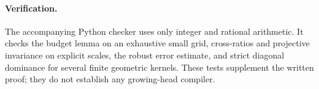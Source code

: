 \documentclass[11pt]{article}
\begin{document}
\paragraph{Verification.}
The accompanying Python checker uses only integer and rational
arithmetic. It checks the budget lemma on an exhaustive small grid,
cross-ratios and projective invariance on explicit scales, the robust
error estimate, and strict diagonal dominance for several finite
geometric kernels. These tests supplement the written proof; they do
not establish any growing-head compiler.
\end{document}
